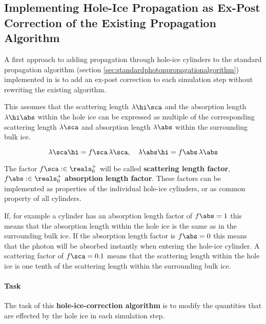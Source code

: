 
\subsection{Implementing Hole-Ice Propagation as Ex-Post Correction of the Existing Propagation Algorithm}
\label{sec:algorithm_a}


A first approach to adding propagation through hole-ice cylinders to the standard propagation algorithm (section \ref{sec:standardphotonpropagationalgorithm}) implemented in  is to add an ex-post correction to each simulation step without rewriting the existing algorithm.


This assumes that the scattering length $\lambda\hi\sca$ and the absorption length $\lambda\hi\abs$ within the hole ice can be expressed as multiple of the corresponding scattering length $\lambda\sca$ and absorption length $\lambda\abs$ within the surrounding bulk ice.

$$
  \lambda\sca\hi = f\sca \, \lambda\sca, \ \ \ \lambda\abs\hi = f\abs \, \lambda\abs
$$

The factor $f\sca :\in \reals^+_0$ will be called \textbf{scattering length factor}, $f\abs :\in \reals^+_0$ \textbf{absorption length factor}. These factors can be implemented as properties of the individual hole-ice cylinders, or as common property of all cylinders.

If, for example a cylinder has an absorption length factor of $f\abs = 1$ this means that the absorption length within the hole ice is the same as in the surrounding bulk ice. If the absorption length factor is $f\abs = 0$ this means that the photon will be absorbed instantly when entering the hole-ice cylinder. A scattering factor of $f\sca=0.1$ means that the scattering length within the hole ice is one tenth of the scattering length within the surrounding bulk ice.

\paragraph{Task} The task of this \textbf{hole-ice-correction algorithm} is to modify the quantities that are effected by the hole ice in each simulation step.

